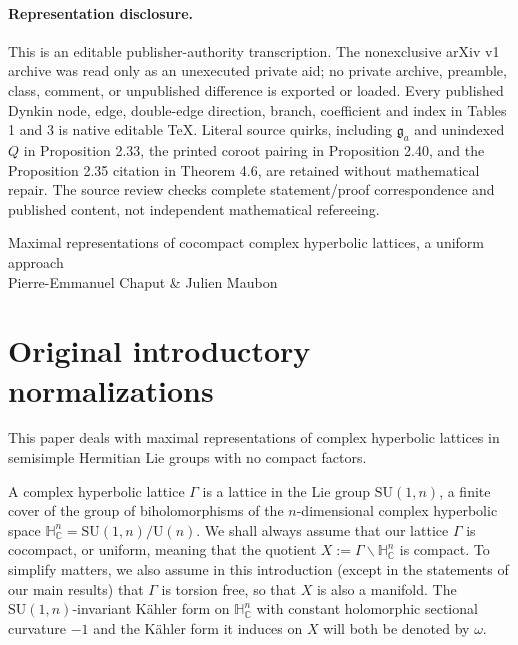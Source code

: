 \documentclass[10pt]{article}
\theoremstyle{definition}
\numberwithin{equation}{section}
\begin{document}
\paragraph{Representation disclosure.}
This is an editable publisher-authority transcription. The nonexclusive arXiv v1 archive was read only as an unexecuted private aid; no private archive, preamble, class, comment, or unpublished difference is exported or loaded. Every published Dynkin node, edge, double-edge direction, branch, coefficient and index in Tables 1 and 3 is native editable TeX. Literal source quirks, including $\mathfrak g_a$ and unindexed $Q$ in Proposition 2.33, the printed coroot pairing in Proposition 2.40, and the Proposition 2.35 citation in Theorem 4.6, are retained without mathematical repair. The source review checks complete statement/proof correspondence and published content, not independent mathematical refereeing.
\clearpage
\begin{center}{\Large Maximal representations of cocompact complex hyperbolic lattices, a uniform approach}\\[1ex]Pierre-Emmanuel Chaput \& Julien Maubon\end{center}
\section*{Original introductory normalizations}
This paper deals with maximal representations of complex hyperbolic lattices in semisimple Hermitian Lie groups with no compact factors.

A complex hyperbolic lattice $\Gamma$ is a lattice in the Lie group $\mathrm{SU}(1,n)$, a finite cover of the group of biholomorphisms of the $n$-dimensional complex hyperbolic space $\mathbb H^n_{\mathbb C}=\mathrm{SU}(1,n)/\mathrm U(n)$. We shall always assume that our lattice $\Gamma$ is cocompact, or uniform, meaning that the quotient $X:=\Gamma\backslash\mathbb H^n_{\mathbb C}$ is compact. To simplify matters, we also assume in this introduction (except in the statements of our main results) that $\Gamma$ is torsion free, so that $X$ is also a manifold. The $\mathrm{SU}(1,n)$-invariant Kähler form on $\mathbb H^n_{\mathbb C}$ with constant holomorphic sectional curvature $-1$ and the Kähler form it induces on $X$ will both be denoted by $\omega$.
\end{document}
